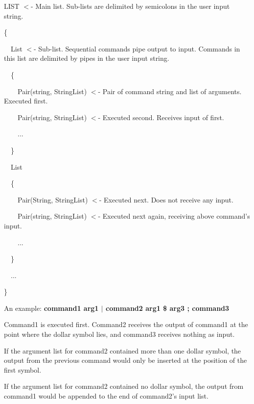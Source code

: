 {\ttfamily L\-I\-S\-T $<$-\/ Main list. Sub-\/lists are delimited by semicolons in the user input string.\par
 \{\par
 ~~List $<$-\/ Sub-\/list. Sequential commands pipe output to input. Commands in this list are delimited by pipes in the user input string.\par
 ~~\{\par
 ~~~~Pair(string, String\-List) $<$-\/ Pair of command string and list of arguments. Executed first.\par
 ~~~~Pair(string, String\-List) $<$-\/ Executed second. Receives input of first.\par
 ~~~~...\par
 ~~\}\par
 \par
 ~~List\par
 ~~\{\par
 ~~~~Pair(\-String, String\-List) $<$-\/ Executed next. Does not receive any input.\par
 ~~~~Pair(string, String\-List) $<$-\/ Executed next again, receiving above command's input.\par
 ~~~~...\par
 ~~\}\par
 \par
 ~~...\par
 \}}\par


An example\-: {\bfseries command1 arg1 $|$ command2 arg1 \$ arg3 ; command3}

Command1 is executed first. Command2 receives the output of command1 at the point where the dollar symbol lies, and command3 receives nothing as input.

If the argument list for command2 contained more than one dollar symbol, the output from the previous command would only be inserted at the position of the first symbol.

If the argument list for command2 contained no dollar symbol, the output from command1 would be appended to the end of command2's input list. 

